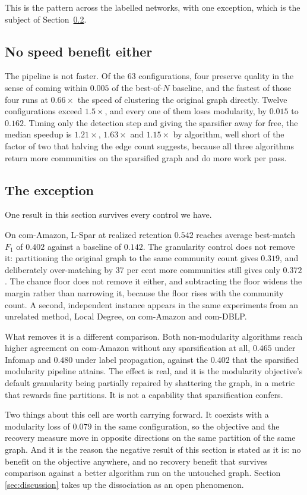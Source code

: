This is the pattern across the labelled networks, with one exception, which is the
subject of Section~\ref{sec:negative:exception}.

\subsection{No speed benefit either}\label{sec:negative:speed}

The pipeline is not faster. Of the 63 configurations, four preserve quality in the
sense of coming within $0.005$ of the best-of-$N$ baseline, and the fastest of
those four runs at $0.66\times$ the speed of clustering the original graph
directly. Twelve configurations exceed $1.5\times$, and every one of them loses
modularity, by $0.015$ to $0.162$. Timing only the detection step and giving the
sparsifier away for free, the median speedup is $1.21\times$, $1.63\times$ and
$1.15\times$ by algorithm, well short of the factor of two that halving the edge
count suggests, because all three algorithms return more communities on the
sparsified graph and do more work per pass.

\subsection{The exception}\label{sec:negative:exception}

One result in this section survives every control we have.

On com-Amazon, L-Spar at realized retention $0.542$
reaches average best-match $F_1$ of $0.402$ against a baseline of $0.142$. The
granularity control does not remove it: partitioning the original graph to the
same community count gives $0.319$, and deliberately over-matching by 37 per cent
more communities still gives only $0.372$. The chance floor does not remove it
either, and subtracting the floor widens the margin rather than narrowing it,
because the floor rises with the community count. A second, independent instance
appears in the same experiments from an unrelated method, Local Degree, on
com-Amazon and com-DBLP.

What removes it is a different comparison. Both non-modularity algorithms reach
higher agreement on com-Amazon without any sparsification at all, $0.465$ under
Infomap and $0.480$ under label propagation, against the $0.402$ that the
sparsified modularity pipeline attains. The effect is real, and it is the
modularity objective's default granularity being partially repaired by shattering
the graph, in a metric that rewards fine partitions. It is not a capability that
sparsification confers.

Two things about this cell are worth carrying forward. It coexists with a
modularity loss of $0.079$ in the same configuration, so the objective and the
recovery measure move in opposite directions on the same partition of the same
graph. And it is the reason the negative result of this section is stated as it
is: no benefit on the objective anywhere, and no recovery benefit that survives
comparison against a better algorithm run on the untouched graph. Section
\ref{sec:discussion} takes up the dissociation as an open phenomenon.
